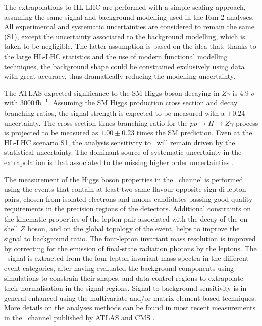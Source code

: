 The extrapolations to HL-LHC are performed with a simple scaling approach, assuming the same signal and background modelling used in the Run-2 analyses. All experimental and systematic uncertainties are considered to remain the same (S1), except the uncertainty associated to the background modelling, which is taken to be negligible. The latter assumption is based on the idea that, thanks to the large HL-LHC statistics and the use of modern functional modelling techniques, the background shape could be constrained exclusively using data with great accuracy, thus dramatically reducing the modelling uncertainty.

The ATLAS expected significance to the SM Higgs boson decaying in $Z\gamma$ is 4.9 $\sigma$ with 3000\,$\mathrm{fb}^{-1}$. Assuming the SM Higgs production cross section and decay branching ratios, the signal strength is expected to be measured with a $\pm0.24$ uncertainty. The cross section times branching ratio for the $pp\rightarrow H \rightarrow Z\gamma$ process is projected to be measured as $1.00\pm0.23$ times the SM prediction. Even at the HL-LHC scenario S1, the analysis sensitivity  to \HZy\ will remain driven by the statistical uncertainty. The dominant source of systematic uncertainty in the extrapolation is that associated to the 
missing higher order uncertainties \cite{ATL-PHYS-PUB-2018-054}.




The measurement of the Higgs boson properties in the \HZZ\ channel is performed using the events that contain at least two same-flavour opposite-sign di-lepton pairs, chosen from isolated electrons and muons candidates passing good quality requirements in the precision regions of the detectors. Additional constraints on the kinematic properties of the lepton pair associated with the decay of the on-shell $Z$ boson, and on the global topology of the event, helps to improve the signal to background ratio. The four-lepton invariant mass resolution is improved by correcting for the emission of final-state radiation photons by the leptons.
The \HZZ\ signal is extracted from the four-lepton invariant mass spectra in the different event categories, after having evaluated the background components using simulations to constrain their shapes, and data control regions to extrapolate their normalisation in the signal regions. Signal to background sensitivity is in general enhanced using the multivariate and/or matrix-element based techniques. More details on the analyses methods can be found in most recent measurements in the \HZZ\ channel published by ATLAS \cite{ATLAS:2018bsg} and CMS \cite{Sirunyan:2017exp}.

